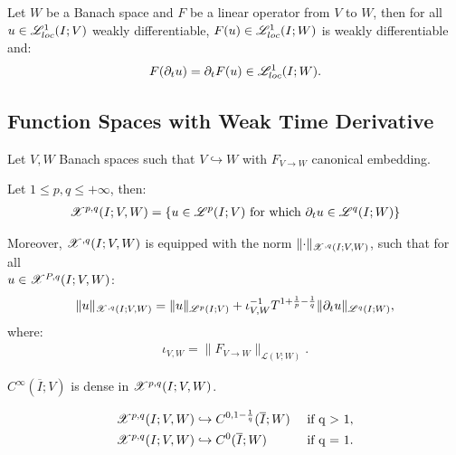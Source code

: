 \begin{lemma}
    Let $W$ be a Banach space and $F$ be a linear operator from $V$ to $W$, then for all $u \in \mathscr{L}^{1}_{loc}(I; V)$ weakly differentiable, $F(u) \in \mathscr{L}^{1}_{loc}(I; W)$ is weakly differentiable and:
    \begin{gather}
        F(\partial_t u) = \partial_t F(u) \in \mathscr{L}^{1}_{loc}(I; W).
    \end{gather}
\end{lemma}

\newpage
\subsection{Function Spaces with Weak Time Derivative}

Let $V, W$ Banach spaces such that $V \hookrightarrow W$ with $F_{V \rightarrow W}$ canonical embedding.

\begin{definition}[$\SpaceXpq{p}{q}(I; V, W)$]
    Let $1 \leq p, q \leq +\infty$, then:
    \begin{gather}
        \mathscr{X}^{p, q}(I; V, W) = \left\{ u \in \mathscr{L}^{p}(I; V) \text{ for which } \partial_t u \in \mathscr{L}^{q}(I; W) \right\}
    \end{gather}

    Moreover, $\mathscr{X}^{, q}(I; V, W)$ is equipped with the norm $\lVert \cdot \rVert_{\mathscr{X}^{, q}(I; V, W)}$, such that for all \\ $u \in \mathscr{X}^{P, q}(I; V, W)$:
    \begin{gather}
        \lVert u \rVert_{\mathscr{X}^{, q}(I; V, W)} = \lVert u \rVert_{\mathscr{L}^{p}(I; V)} + \iota_{V, W}^{-1}T^{1 + \frac{1}{p} - \frac{1}{q}} \lVert \partial_t u \rVert_{\mathscr{L}^{q}(I; W)},
    \end{gather}
    where:
    \begin{gather}
        \iota_{V, W} = \lVert F_{V \rightarrow W} \rVert_{\mathcal{L}(V;W)}.
    \end{gather}
\end{definition}

\begin{theorem}
    $C^{\infty}(\overline{I}; V)$ is dense in $\SpaceXpq{p}{q}(I; V, W)$.
\end{theorem}

\begin{lemma}
    \begin{align}
        & \mathscr{X}^{p, q}(I; V, W) \hookrightarrow C^{0, 1 - \frac{1}{q}}(\overline{I}; W) & \text{ if q > 1}, \\
        & \mathscr{X}^{p, q}(I; V, W) \hookrightarrow C^{0}(\overline{I}; W) & \text{ if q = 1}.
    \end{align}
\end{lemma}

